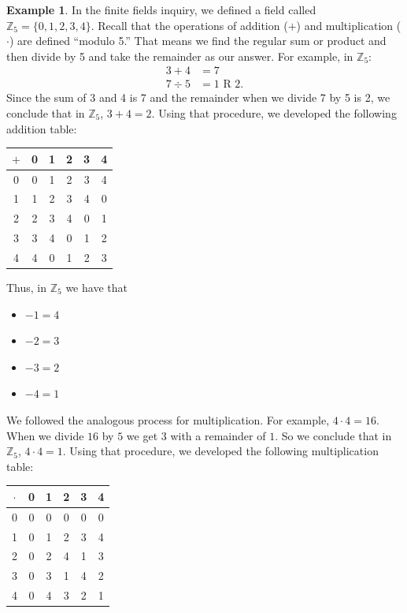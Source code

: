 \documentclass[11pt]{article}
\theoremstyle{definition}
\newtheorem{example}[theorem]{Example}
\begin{document}
\begin{example}
  In the finite fields inquiry, we defined a field called $\mathbb{Z}_5 = \{ 0, 1, 2, 3, 4\}$. Recall that the operations of addition ($+$) and multiplication ($\cdot$) are defined ``modulo 5.'' That means we find
  the regular sum or product and then divide by 5 and take the remainder as our answer. For example, in $\mathbb{Z}_5$:
  \begin{align*}
    3 + 4 &= 7\\
    7 \div 5 &= 1 \text{ R } 2.
  \end{align*}
  Since the sum of 3 and 4 is 7 and the remainder when we divide 7 by 5 is 2, we conclude that in $\mathbb{Z}_5$, $3 + 4 = 2$. Using that procedure, we 
  developed the following addition table:

  \begin{center}
    \begin{tabular}{|c|c|c|c|c|c|}\\ \hline
      $+$ & 0 & 1 & 2 & 3 & 4 \\ \hline
      0   & 0 & 1 & 2 & 3 & 4 \\ \hline
      1   & 1 & 2 & 3 & 4 & 0 \\ \hline
      2   & 2 & 3 & 4 & 0 & 1 \\ \hline
      3   & 3 & 4 & 0 & 1 & 2 \\ \hline
      4   & 4 & 0 & 1 & 2 & 3 \\ \hline
    \end{tabular}
  \end{center}
  Thus, in $\mathbb{Z}_5$ we have that
  \begin{itemize}
    \item $-1 = 4$
    \item $-2 = 3$
    \item $-3 = 2$
    \item $-4 = 1$
  \end{itemize}

  We followed the analogous process for multiplication. For example, $4 \cdot 4 = 16$. When we divide $16$ by $5$ we get $3$ with a remainder of $1$. So we
  conclude that in $\mathbb{Z}_5$, $4 \cdot 4 = 1$. Using that procedure, we developed the following multiplication table:

  \begin{center}
    \begin{tabular}{|c|c|c|c|c|c|}\\ \hline
      $\cdot$ & 0 & 1 & 2 & 3 & 4 \\ \hline
      0       & 0 & 0 & 0 & 0 & 0 \\ \hline
      1       & 0 & 1 & 2 & 3 & 4 \\ \hline
      2       & 0 & 2 & 4 & 1 & 3 \\ \hline
      3       & 0 & 3 & 1 & 4 & 2 \\ \hline
      4       & 0 & 4 & 3 & 2 & 1 \\ \hline
    \end{tabular}
  \end{center}


\end{example}
\end{document}
